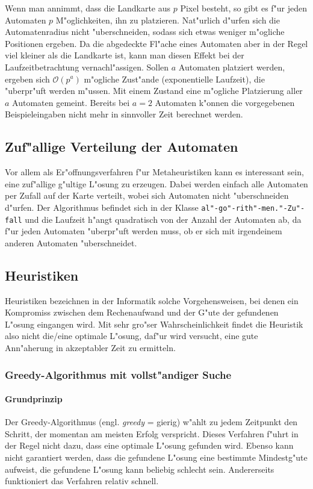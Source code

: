 Wenn man annimmt, dass die Landkarte aus \(p\) Pixel besteht, so gibt es f"ur jeden Automaten \(p\) M"oglichkeiten, ihn zu platzieren. Nat"urlich d"urfen sich die Automatenradius nicht "uberschneiden, sodass sich etwas weniger m"ogliche Positionen ergeben. Da die abgedeckte Fl"ache eines Automaten aber in der Regel viel kleiner als die Landkarte ist, kann man diesen Effekt bei der Laufzeitbetrachtung vernachl"assigen. Sollen \(a\) Automaten platziert werden, ergeben sich \(\mathcal{O}(p^a)\) m"ogliche Zust"ande (exponentielle Laufzeit), die "uberpr"uft werden m"ussen. Mit einem Zustand eine m"ogliche Platzierung aller \(a\) Automaten gemeint.  Bereits bei \(a=2\) Automaten k"onnen die vorgegebenen Beispieleingaben nicht mehr in sinnvoller Zeit berechnet werden. 

\subsection{Zuf"allige Verteilung der Automaten}
Vor allem als Er"offnungsverfahren f"ur Metaheuristiken kann es interessant sein, eine zuf"allige g"ultige L"osung zu erzeugen. Dabei werden einfach alle Automaten per Zufall auf der Karte verteilt, wobei sich Automaten nicht "uberschneiden d"urfen. Der Algorithmus befindet sich in der Klasse \texttt{al"-go"-rith"-men."-Zu"-fall} und die Laufzeit h"angt quadratisch von der Anzahl der Automaten ab, da f"ur jeden Automaten "uberpr"uft werden muss, ob er sich mit irgendeinem anderen Automaten "uberschneidet. 

\subsection{Heuristiken}
Heuristiken bezeichnen in der Informatik solche Vorgehensweisen, bei denen ein Kompromiss zwischen dem Rechenaufwand und der G"ute der gefundenen L"osung eingangen wird. Mit sehr gro"ser Wahrscheinlichkeit findet die Heuristik also nicht die/eine optimale L"osung, daf"ur wird versucht, eine gute Ann"aherung in akzeptabler Zeit zu ermitteln. 

\subsubsection{Greedy-Algorithmus mit vollst"andiger Suche}
\paragraph{Grundprinzip}
Der Greedy-Algorithmus (engl. \emph{greedy} = gierig) w"ahlt zu jedem Zeitpunkt den Schritt, der momentan am meisten Erfolg verspricht. Dieses Verfahren f"uhrt in der Regel nicht dazu, dass eine optimale L"osung gefunden wird. Ebenso kann nicht garantiert werden, dass die gefundene L"osung eine bestimmte Mindestg"ute aufweist, die gefundene L"osung kann beliebig schlecht sein. Andererseits funktioniert das Verfahren relativ schnell. 

